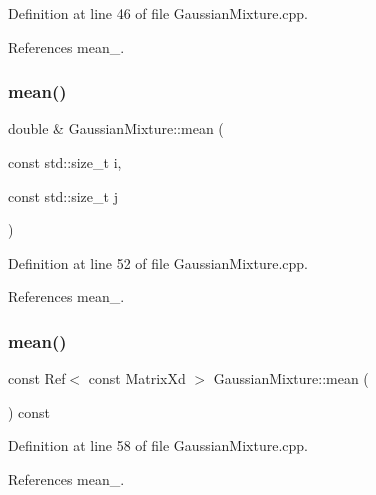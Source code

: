 Definition at line 46 of file Gaussian\+Mixture.\+cpp.



References mean\+\_\+.

\mbox{\label{classbfl_1_1GaussianMixture_a21013d54d99ca5bfd1ec566a0815821e}} 
\subsubsection{\texorpdfstring{mean()}{mean()}\hspace{0.1cm}{\footnotesize\ttfamily [3/6]}}
{\footnotesize\ttfamily double \& Gaussian\+Mixture\+::mean (\begin{DoxyParamCaption}\item[{const std\+::size\+\_\+t}]{i,  }\item[{const std\+::size\+\_\+t}]{j }\end{DoxyParamCaption})}



Definition at line 52 of file Gaussian\+Mixture.\+cpp.



References mean\+\_\+.

\mbox{\label{classbfl_1_1GaussianMixture_ad420f06f7680003453f64fd18bbb67da}} 
\subsubsection{\texorpdfstring{mean()}{mean()}\hspace{0.1cm}{\footnotesize\ttfamily [4/6]}}
{\footnotesize\ttfamily const Ref$<$ const Matrix\+Xd $>$ Gaussian\+Mixture\+::mean (\begin{DoxyParamCaption}{ }\end{DoxyParamCaption}) const}



Definition at line 58 of file Gaussian\+Mixture.\+cpp.



References mean\+\_\+.

\mbox{\label{classbfl_1_1GaussianMixture_ad0dab37b16097d498dedaf23d0af3c18}} 
